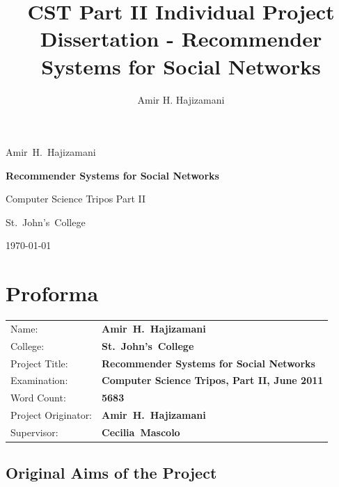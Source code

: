 \documentclass[a4paper,12pt,twoside,notitlepage]{report}
\author{Amir H. Hajizamani}
\title{CST Part II Individual Project Dissertation - Recommender Systems for 
Social Networks}
\def\projtitle{Recommender Systems for Social Networks}
\def\authorname{Amir~H.~Hajizamani}
\def\authorcollege{St.~John's~College}
\def\projsupervisor{Cecilia~Mascolo}
\begin{document}

\thispagestyle{empty} 

\begin{flushright}
\authorname
\end{flushright}
\bigskip %

\vfill

\begin{center}
 \medskip
 {\Large\bf \projtitle}

 \vspace*{1cm}

 {\large Computer Science Tripos Part II}

 \bigskip

 {\large \authorcollege}

 \bigskip

 {\large \today}
\end{center}

\vfill

\cleardoublepage



\section*{Proforma}

\begin{tabular}{ll}
Name:               & \bf \authorname \\
College:            & \bf \authorcollege \\
Project Title:      & \bf \projtitle \\
Examination:        & \bf Computer Science Tripos, Part II, June 2011 \\
Word Count:         & \bf 5683 \\
Project Originator: & \bf \authorname \\
Supervisor:         & \bf \projsupervisor \\
\end{tabular}


\subsection*{Original Aims of the Project}
\end{document}
